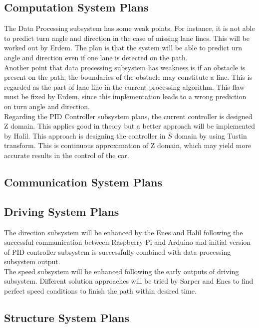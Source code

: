 \documentclass[a4paper,12pt]{article}
\begin{document}
	\subsection{Computation System Plans}
	The Data Processing subsystem has some weak points. For instance, it is not able to predict turn angle and direction in the case of missing lane lines. This will be worked out by Erdem. The plan is that the system will be able to predict urn angle and direction even if one lane is detected on the path.\\
	
	Another point that data processing subsystem has weakness is if an obstacle is present on the path, the boundaries of the obstacle may constitute a line. This is regarded as the part of lane line in the current processing algorithm. This flaw must be fixed by Erdem, since this implementation leads to a wrong prediction on turn angle and direction.\\
	
	Regarding the PID Controller subsystem plans, the current controller is designed Z domain. This applies good in theory but a better approach will be implemented by Halil. This approach is designing the controller in $\overline{S}$ domain by using Tustin transform. This is continuous approximation of Z domain, which may yield more accurate results in the control of the car.
	
	
	\subsection{Communication System Plans}
	\subsection{Driving System Plans}
		The direction subsystem will be enhanced by the Enes and Halil following the successful communication between Raspberry Pi and Arduino and initial version of PID controller subsystem is successfully combined with data processing subsystem output. \\
		
		The speed subsystem will be enhanced following the early outputs of driving subsystem. Different solution approaches will be tried by Sarper and Enes to find perfect speed conditions to finish the path within desired time.
	
	\subsection{Structure System Plans}
	
\end{document}
